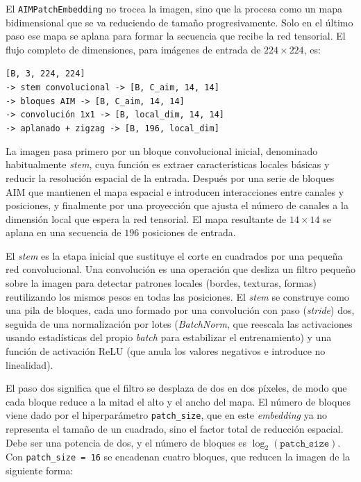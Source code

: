 El \texttt{AIMPatchEmbedding} no trocea la imagen, sino que la procesa como un mapa bidimensional que se va reduciendo de tamaño progresivamente. Solo en el último paso ese mapa se aplana para formar la secuencia que recibe la red tensorial. El flujo completo de dimensiones, para imágenes de entrada de $224\times224$, es:

\begin{center}
\texttt{[B, 3, 224, 224]} \\
\texttt{-> stem convolucional -> [B, C\_aim, 14, 14]} \\
\texttt{-> bloques AIM -> [B, C\_aim, 14, 14]} \\
\texttt{-> convolución 1x1 -> [B, local\_dim, 14, 14]} \\
\texttt{-> aplanado + zigzag -> [B, 196, local\_dim]}
\end{center}

La imagen pasa primero por un bloque convolucional inicial, denominado habitualmente \textit{stem}, cuya función es extraer características locales básicas y reducir la resolución espacial de la entrada. Después por una serie de bloques AIM que mantienen el mapa espacial e introducen interacciones entre canales y posiciones, y finalmente por una proyección que ajusta el número de canales a la dimensión local que espera la red tensorial. El mapa resultante de $14\times14$ se aplana en una secuencia de $196$ posiciones de entrada.

El \textit{stem} es la etapa inicial que sustituye el corte en cuadrados por una pequeña red convolucional. Una convolución es una operación que desliza un filtro pequeño sobre la imagen para detectar patrones locales (bordes, texturas, formas) reutilizando los mismos pesos en todas las posiciones. El \textit{stem} se construye como una pila de bloques, cada uno formado por una convolución con paso (\textit{stride}) dos, seguida de una normalización por lotes (\textit{BatchNorm}, que reescala las activaciones usando estadísticas del propio \textit{batch} para estabilizar el entrenamiento) y una función de activación ReLU (que anula los valores negativos e introduce no linealidad).

El paso dos significa que el filtro se desplaza de dos en dos píxeles, de modo que cada bloque reduce a la mitad el alto y el ancho del mapa. El número de bloques viene dado por el hiperparámetro \texttt{patch\_size}, que en este \textit{embedding} ya no representa el tamaño de un cuadrado, sino el factor total de reducción espacial. Debe ser una potencia de dos, y el número de bloques es $\log_2(\texttt{patch\_size})$. Con \texttt{patch\_size = 16} se encadenan cuatro bloques, que reducen la imagen de la siguiente forma:

